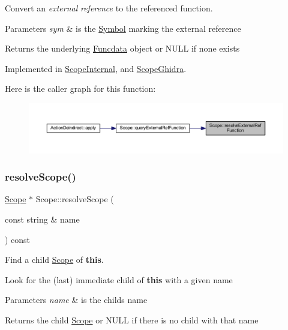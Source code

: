 Convert an {\itshape external} {\itshape reference} to the referenced function. 


\begin{DoxyParams}{Parameters}
{\em sym} & is the \mbox{\hyperlink{class_symbol}{Symbol}} marking the external reference \\
\hline
\end{DoxyParams}
\begin{DoxyReturn}{Returns}
the underlying \mbox{\hyperlink{class_funcdata}{Funcdata}} object or N\+U\+LL if none exists 
\end{DoxyReturn}


Implemented in \mbox{\hyperlink{class_scope_internal_acf54c42b2ce7edfa37f9bf1223bc2840}{Scope\+Internal}}, and \mbox{\hyperlink{class_scope_ghidra_afdb2e6de63033bb78e6c4168c8e25227}{Scope\+Ghidra}}.

Here is the caller graph for this function\+:
\nopagebreak
\begin{figure}[H]
\begin{center}
\leavevmode
\includegraphics[width=350pt]{class_scope_af4c45025894f1996ef0f3556752cd997_icgraph}
\end{center}
\end{figure}
\mbox{\label{class_scope_a3b252ca0ce3155c06fe0cee6eae9265b}} 
\subsubsection{\texorpdfstring{resolveScope()}{resolveScope()}}
{\footnotesize\ttfamily \mbox{\hyperlink{class_scope}{Scope}} $\ast$ Scope\+::resolve\+Scope (\begin{DoxyParamCaption}\item[{const string \&}]{name }\end{DoxyParamCaption}) const}



Find a child \mbox{\hyperlink{class_scope}{Scope}} of {\bfseries{this}}. 

Look for the (last) immediate child of {\bfseries{this}} with a given name 
\begin{DoxyParams}{Parameters}
{\em name} & is the child\textquotesingle{}s name \\
\hline
\end{DoxyParams}
\begin{DoxyReturn}{Returns}
the child \mbox{\hyperlink{class_scope}{Scope}} or N\+U\+LL if there is no child with that name 
\end{DoxyReturn}


